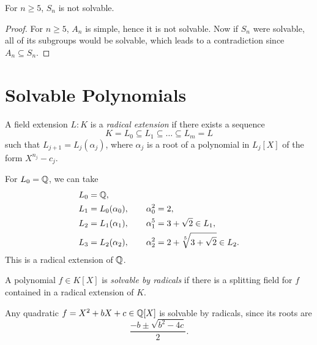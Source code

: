 \begin{corollary}
  For $n \ge 5$, $S_n$ is not solvable.
\end{corollary}

\begin{proof}
  For $n \ge 5$, $A_n$ is simple, hence it is not
  solvable. Now if $S_n$ were solvable, all of its
  subgroups would be solvable, which leads to
  a contradiction since $A_n \subseteq S_n$.
\end{proof}

\section{Solvable Polynomials}

\begin{definition}
  A field extension $L : K$ is a \emph{radical extension}
  if there exists a sequence
  \[
    K = L_0 \subseteq L_1 \subseteq \dots \subseteq L_m = L
  \]
  such that $L_{j + 1} = L_j(\alpha_j)$, where
  $\alpha_j$ is a root of a polynomial in $L_j[X]$ of
  the form $X^{n_j} - c_j$.
\end{definition}

\begin{example}
  For $L_0 = \mathbb{Q}$, we can take
  \begin{align*}
    L_0 &= \mathbb{Q}, \\
    L_1 &= L_0(\alpha_0), \quad \quad \alpha_0^2 = 2, \\
    L_2 &= L_1(\alpha_1), \quad \quad \alpha_1^5 = 3 + \sqrt{2} \in L_1, \\
    L_3 &= L_2(\alpha_2), \quad \quad \alpha_2^2 = 2 + \sqrt[5]{3 + \sqrt{2}} \in L_2.
  \end{align*}
  This is a radical extension of $\mathbb{Q}$.
\end{example}

\begin{definition}
  A polynomial $f \in K[X]$ is \emph{solvable by radicals}
  if there is a splitting field for $f$ contained in a
  radical extension of $K$.
\end{definition}

\begin{example}
  Any quadratic $f = X^2 + bX + c \in \mathbb{Q}[X]$ is
  solvable by radicals, since its roots are
  \[
    \frac{-b \pm \sqrt{b^2 - 4c}}{2}.
  \]
\end{example}

